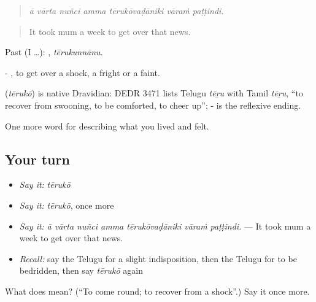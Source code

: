 \begin{quote}
\emph{ā vārta nuñci amma tērukōvaḍāniki vāraṁ paṭṭindi.}
\end{quote}

\begin{quote}
It took mum a week to get over that news.
\end{quote}

Past (I …): , \emph{tērukunnānu}.

- , to get over a shock, a fright or a faint.

\begin{cousinweb}
\textbf{} (\emph{tērukō}) is native Dravidian: DEDR 3471 lists Telugu \emph{tēṟu} with Tamil \emph{tēṟu}, \textquotedblleft{}to recover from swooning, to be comforted, to cheer up\textquotedblright{}; - is the reflexive ending.
\end{cousinweb}

\begin{grammarlens}[title={What you've built}]
One more word for describing what you lived and felt.
\end{grammarlens}

\subsection*{Your turn}
\begin{itemize}
\raggedright
  \item \emph{Say it:} \emph{tērukō}
  \item \emph{Say it:} \emph{tērukō}, once more
  \item \emph{Say it:} \emph{ā vārta nuñci amma tērukōvaḍāniki vāraṁ paṭṭindi.} — It took mum a week to get over that news.
  \item \emph{Recall:} say the Telugu for a slight indisposition, then the Telugu for to be bedridden, then say \emph{tērukō} again
\end{itemize}

\begin{tcolorbox}[breakable,colback=teal!4,colframe=teal!35!black,title={Before you move on}]
What does  mean? (\textquotedblleft{}To come round; to recover from a shock\textquotedblright{}.) Say it once more.
\end{tcolorbox}
